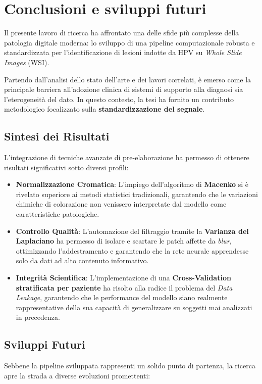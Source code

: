 \chapter{Conclusioni e sviluppi futuri}

\label{chap:conclusioni}

Il presente lavoro di ricerca ha affrontato una delle sfide più complesse della patologia digitale moderna: lo sviluppo di una pipeline computazionale robusta e standardizzata per l'identificazione di lesioni indotte da HPV su \textit{Whole Slide Images} (WSI). 

Partendo dall'analisi dello stato dell'arte e dei lavori correlati, è emerso come la principale barriera all'adozione clinica di sistemi di supporto alla diagnosi sia l'eterogeneità del dato. In questo contesto, la tesi ha fornito un contributo metodologico focalizzato sulla \textbf{standardizzazione del segnale}.

\section*{Sintesi dei Risultati}
L'integrazione di tecniche avanzate di pre-elaborazione ha permesso di ottenere risultati significativi sotto diversi profili:
\begin{itemize}
	\item \textbf{Normalizzazione Cromatica}: L'impiego dell'algoritmo di \textbf{Macenko} si è rivelato superiore ai metodi statistici tradizionali, garantendo che le variazioni chimiche di colorazione non venissero interpretate dal modello come caratteristiche patologiche.
	\item \textbf{Controllo Qualità}: L'automazione del filtraggio tramite la \textbf{Varianza del Laplaciano} ha permesso di isolare e scartare le patch affette da \textit{blur}, ottimizzando l'addestramento e garantendo che la rete neurale apprendesse solo da dati ad alto contenuto informativo.
	\item \textbf{Integrità Scientifica}: L'implementazione di una \textbf{Cross-Validation stratificata per paziente} ha risolto alla radice il problema del \textit{Data Leakage}, garantendo che le performance del modello siano realmente rappresentative della sua capacità di generalizzare su soggetti mai analizzati in precedenza.
\end{itemize}

\section*{Sviluppi Futuri}
Sebbene la pipeline sviluppata rappresenti un solido punto di partenza, la ricerca apre la strada a diverse evoluzioni promettenti:

